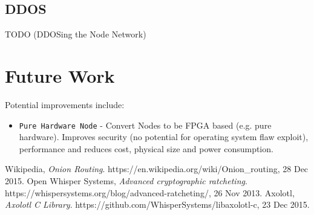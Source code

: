 \documentclass{article}
\begin{document}
\newpage

\subsection{DDOS}
TODO (DDOSing the Node Network)

\section{Future Work}
Potential improvements include:
\begin{itemize}
	\item \texttt{Pure Hardware Node} - Convert Nodes to be FPGA based (e.g. pure hardware). Improves security (no potential for operating system flaw exploit), performance and reduces cost, physical size and power consumption.
\end{itemize}

\newpage

\begin{thebibliography}{9}
	 Wikipedia, \emph{Onion Routing}. https://en.wikipedia.org/wiki/Onion\_routing, 28 Dec 2015.
	 Open Whisper Systems, \emph{Advanced cryptographic ratcheting}. https://whispersystems.org/blog/advanced-ratcheting/, 26 Nov 2013.
	 Axolotl, \emph{ Axolotl C Library}. https://github.com/WhisperSystems/libaxolotl-c, 23 Dec 2015.

\end{thebibliography}
\end{document}
